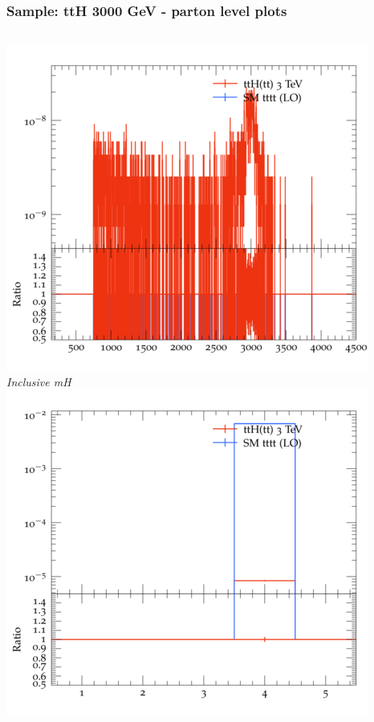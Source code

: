 \documentclass{beamer}
\begin{document}
\begin{frame}
\frametitle{Sample: ttH 3000 GeV - parton level plots}
\begin{columns}
\includegraphics[width=\textwidth]{../plots/ttH_3000/tttt_ttH/Inclusive_mH.png}\\
\textit{\small Inclusive mH}
\includegraphics[width=\textwidth]{../plots/ttH_3000/tttt_ttH/Inclusive_nTop.png}\\

\end{columns}
\end{frame}
\end{document}
